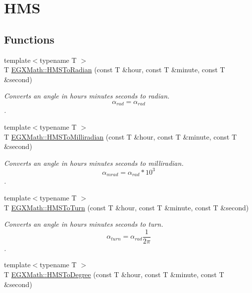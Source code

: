\hypertarget{group___e_g_x_math-_angle_conversions-_h_m_s}{}\section{H\+MS}
\label{group___e_g_x_math-_angle_conversions-_h_m_s}
\subsection*{Functions}
\begin{DoxyCompactItemize}
\item 
{\footnotesize template$<$typename T $>$ }\\T \mbox{\hyperlink{group___e_g_x_math-_angle_conversions-_h_m_s_ga5f0873c7c013ba2c5784de3725f2c042}{E\+G\+X\+Math\+::\+H\+M\+S\+To\+Radian}} (const T \&hour, const T \&minute, const T \&second)
\begin{DoxyCompactList}\small\item\em Converts an angle in hours minutes seconds to radian. \[\alpha_{rad}=\alpha_{rad}\]. \end{DoxyCompactList}\item 
{\footnotesize template$<$typename T $>$ }\\T \mbox{\hyperlink{group___e_g_x_math-_angle_conversions-_h_m_s_ga175cead130e511e2c61545d71e3dc2f3}{E\+G\+X\+Math\+::\+H\+M\+S\+To\+Milliradian}} (const T \&hour, const T \&minute, const T \&second)
\begin{DoxyCompactList}\small\item\em Converts an angle in hours minutes seconds to milliradian. \[\alpha_{mrad}=\alpha_{rad}*10^3\]. \end{DoxyCompactList}\item 
{\footnotesize template$<$typename T $>$ }\\T \mbox{\hyperlink{group___e_g_x_math-_angle_conversions-_h_m_s_ga9352ac15414f9e52351f21d7976964db}{E\+G\+X\+Math\+::\+H\+M\+S\+To\+Turn}} (const T \&hour, const T \&minute, const T \&second)
\begin{DoxyCompactList}\small\item\em Converts an angle in hours minutes seconds to turn. \[\alpha_{turn}=\alpha_{rad}\frac{1}{2 \pi}\]. \end{DoxyCompactList}\item 
{\footnotesize template$<$typename T $>$ }\\T \mbox{\hyperlink{group___e_g_x_math-_angle_conversions-_h_m_s_ga281ee88be0cb04f58bdf19efcef58146}{E\+G\+X\+Math\+::\+H\+M\+S\+To\+Degree}} (const T \&hour, const T \&minute, const T \&second)

\end{DoxyCompactItemize}

